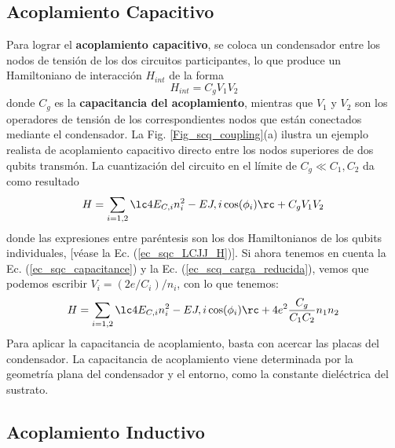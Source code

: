     
    
    \subsection{Acoplamiento Capacitivo}

        Para lograr el \textbf{acoplamiento capacitivo}, se coloca un condensador entre los nodos de tensión de los dos circuitos participantes, lo que produce un Hamiltoniano de interacción $H_{int}$ de la forma
        \begin{equation}
            H_{int} = C_g V_1 V_2 
        \end{equation}
        donde $C_g$ es la \textbf{capacitancia del acoplamiento}, mientras que $V_1$ y $V_2$ son los operadores de tensión de los correspondientes nodos que están conectados mediante el condensador. La Fig. \ref{Fig_scq_coupling}(a) ilustra un ejemplo realista de acoplamiento capacitivo directo entre los nodos superiores de dos qubits transmón. La cuantización del circuito en el límite de $C_g \ll C_1, C_2$ da como resultado
        \begin{equation}
            H = \sum_{i=1,2} \lc 4 E_{C,i} n_i^2 - E{J,i} \cos (\phi_i) \rc + C_g V_1 V_2 \,
        \end{equation}
        donde las expresiones entre paréntesis son los dos Hamiltonianos de los qubits individuales, [véase la Ec. (\ref{ec_sqc_LCJJ_H})]. Si ahora tenemos en cuenta la Ec. (\ref{ec_sqc_capacitance}) y la Ec. (\ref{ec_scq_carga_reducida}), vemos que podemos escribir $V_i = (2e/C_i)/n_i$, con lo que tenemos:
        \begin{equation} \label{ec_scq_acoplamiento_C_H}
            H = \sum_{i=1,2} \lc 4 E_{C,i} n_i^2 - E{J,i} \cos (\phi_i) \rc + 4 e^2 \frac{C_g}{C_1 C_2} n_1 n_2 \,
        \end{equation}
        Para aplicar la capacitancia de acoplamiento, basta con acercar las placas del condensador. La capacitancia de acoplamiento viene determinada por la geometría plana del condensador y el entorno, como la constante dieléctrica del sustrato.





    \subsection{Acoplamiento Inductivo}

